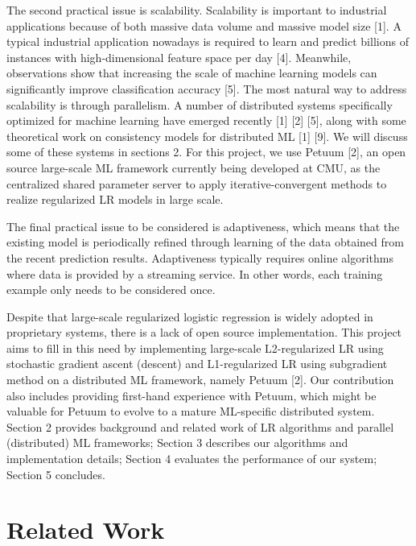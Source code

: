 \documentclass{article} %
\begin{document}
The second practical issue is scalability. Scalability is important to industrial applications because of both massive data volume and massive model size [1]. A typical industrial application nowadays is required to learn and predict billions of instances with high-dimensional feature space per day [4]. Meanwhile, observations show that increasing the scale of machine learning models can significantly improve classification accuracy [5]. The most natural way to address scalability is through parallelism. A number of distributed systems specifically optimized for machine learning have emerged recently [1] [2] [5], along with some theoretical work on consistency models for distributed ML [1] [9]. We will discuss some of these systems in sections 2. For this project, we use Petuum [2], an open source large-scale ML framework currently being developed at CMU, as the centralized shared parameter server to apply iterative-convergent methods to realize regularized LR models in large scale.

The final practical issue to be considered is adaptiveness, which means that the existing model is periodically refined through learning of the data obtained from the recent prediction results. Adaptiveness typically requires online algorithms where data is provided by a streaming service. In other words, each training example only needs to be considered once.

Despite that large-scale regularized logistic regression is widely adopted in proprietary systems, there is a lack of open source implementation. This project aims to fill in this need by implementing large-scale L2-regularized LR using stochastic gradient ascent (descent) and L1-regularized LR using subgradient method on a distributed ML framework, namely Petuum [2]. Our contribution also includes providing first-hand experience with Petuum, which might be valuable for Petuum to evolve to a mature ML-specific distributed system. Section 2 provides background and related work of LR algorithms and parallel (distributed) ML frameworks; Section 3 describes our algorithms and implementation details; Section 4 evaluates the performance of our system; Section 5 concludes. 

\section{Related Work}
\label{gen_inst}
\end{document}
